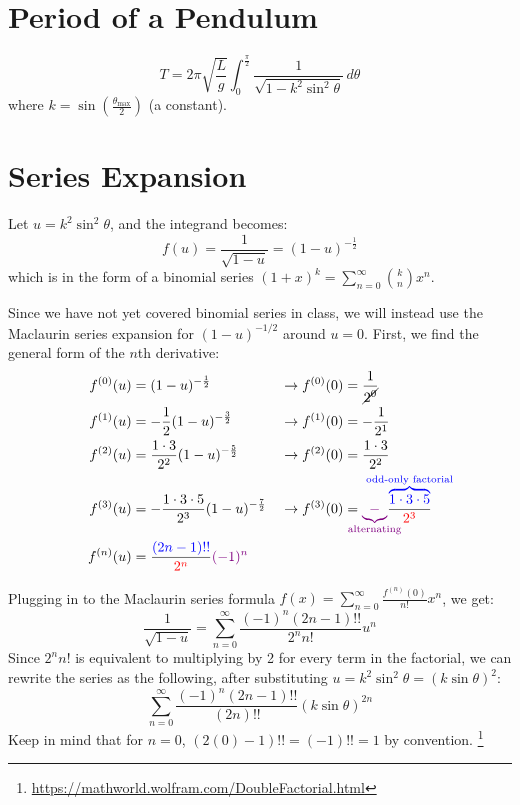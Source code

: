 \documentclass[12pt]{article}
\begin{document}
\section{Period of a Pendulum}
\[
  T = 2\pi \sqrt{\frac{L}{g}} \int_{0}^{\frac{\pi}{2}} \frac{1}{\sqrt{1 - k^2
  \sin^2 \theta}} \, d\theta
\]
where $k = \sin\left(\frac{\theta_{\mathrm{max}}}{2}\right)$ (a constant).

\section{Series Expansion}
Let $u = k^2 \sin^2 \theta$, and the integrand becomes:
\[
  f(u) = \frac{1}{\sqrt{1 - u}} = (1 - u)^{-\frac{1}{2}}
\]
which is in the form of a binomial series $(1+x)^k =
\sum_{n=0}^{\infty} \binom{k}{n} x^n$.

Since we have not yet covered binomial series in class, we will instead
use the Maclaurin series expansion for $(1 - u)^{-1/2}$ around $u = 0$. First, we find the general form of the $n$th derivative:
\begin{align*}
  f^{(0)}(u) &= (1-u)^{-\frac{1}{2}} &&\rightarrow f^{(0)}(0) = \frac{1}{\cancel{2^0}} \\
  f^{(1)}(u) &= -\frac{1}{2} (1-u)^{-\frac{3}{2}} &&\rightarrow f^{(1)}(0) = -\frac{1}{2^1} \\
  f^{(2)}(u) &= \frac{1\cdot3}{2^2} (1-u)^{-\frac{5}{2}} &&\rightarrow f^{(2)}(0) = \frac{1\cdot3}{2^2} \\
  f^{(3)}(u) &= -\frac{1\cdot3\cdot5}{2^3} (1-u)^{-\frac{7}{2}} &&\rightarrow f^{(3)}(0) = {\color{violet}\underbrace{-}_{\mathclap{\text{alternating}}}} \frac{\color{blue}\overbrace{1\cdot3\cdot5}^{\mathclap{\text{odd-only factorial}}}}{\color{red}2^3} \\
  f^{(n)}(u) &= \frac{{\color{blue}(2n-1)!!}}{{\color{red}2^n}} {\color{violet}(-1)^n}
\end{align*}

Plugging in to the Maclaurin series formula $f(x) = \sum_{n=0}^{\infty} \frac{f^{(n)}(0)}{n!} x^n$, we get:
\[
  \frac{1}{\sqrt{1 - u}} = \sum_{n=0}^{\infty} \frac{(-1)^n (2n-1)!!}{2^n n!} u^n
\]
Since $2^n n!$ is equivalent to multiplying by 2 for every term in the factorial, we can rewrite the series as the following, after substituting $u = k^2 \sin^2 \theta = (k\sin\theta)^2$:
\[
  \sum_{n=0}^{\infty} \frac{(-1)^n (2n-1)!!}{(2n)!!} {\left(k\sin\theta\right)}^{2n}
\]
Keep in mind that for $n = 0$, $(2(0) - 1)!! = (-1)!! = 1$ by convention. \footnote{\url{https://mathworld.wolfram.com/DoubleFactorial.html}}
\end{document}
